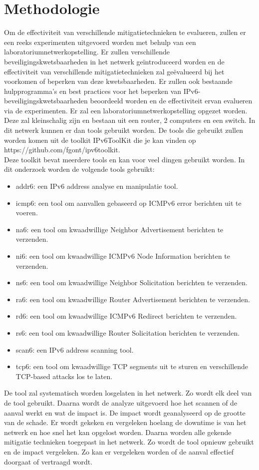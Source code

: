 \section{Methodologie}%
\label{sec:methodologie}
Om de effectiviteit van verschillende mitigatietechnieken te evalueren, zullen er een reeks experimenten uitgevoerd worden met behulp van een laboratoriumnetwerkopstelling. Er zullen verschillende beveiligingskwetsbaarheden in het netwerk geïntroduceerd worden en de effectiviteit van verschillende mitigatietechnieken zal geëvalueerd bij het voorkomen of beperken van deze kwetsbaarheden. Er zullen ook bestaande hulpprogramma's en best practices voor het beperken van IPv6-beveiligingskwetsbaarheden beoordeeld worden en de effectiviteit ervan evalueren via de experimenten.
Er zal een laboratoriumnetwerkopstelling opgezet worden. Deze zal kleinschalig zijn en bestaan uit een router, 2 computers en een switch. In dit netwerk kunnen er dan tools gebruikt worden. De tools die gebruikt zullen worden komen uit de toolkit  IPv6ToolKit die je kan vinden op https://github.com/fgont/ipv6toolkit. \\
Deze toolkit bevat meerdere tools en kan voor veel dingen gebruikt worden. In dit onderzoek worden de volgende tools gebruikt:

\begin{itemize}
    \item	addr6: een IPv6 address analyse en manipulatie tool.
    \item	icmp6: een tool om aanvallen gebaseerd op ICMPv6 error berichten uit te voeren.
    \item	na6: een tool om kwaadwillige  Neighbor Advertisement berichten te verzenden.
    \item	ni6: een tool om kwaadwillige ICMPv6 Node Information berichten te verzenden.
    \item	ns6: een tool om kwaadwillige Neighbor Solicitation berichten te verzenden.
    \item	ra6: een tool om kwaadwillige Router Advertisement berichten te verzenden.
    \item	rd6: een tool om kwaadwillige ICMPv6 Redirect berichten te verzenden.
    \item	rs6: een tool om kwaadwillige Router Solicitation berichten te verzenden.
    \item	scan6: een IPv6 address scanning tool.
    \item	tcp6: een tool om kwaadwillige TCP segments uit te sturen en verschillende TCP-based attacks los te laten.
\end{itemize}
De tool zal systematisch worden losgelaten in het netwerk. Zo wordt elk deel van de tool gebruikt. Daarna wordt de analyze uitgevoerd hoe het scannen of de aanval werkt en wat de impact is. De impact wordt geanalyseerd op de grootte van de schade. Er wordt gekeken en vergeleken hoelang de downtime is van het netwerk en hoe snel het kan opgelost worden. Daarna worden alle gekende mitigatie technieken toegepast in het netwerk. Zo wordt de tool opnieuw gebruikt en de impact vergeleken. Zo kan er vergeleken worden of de aanval effectief doorgaat of vertraagd wordt.

